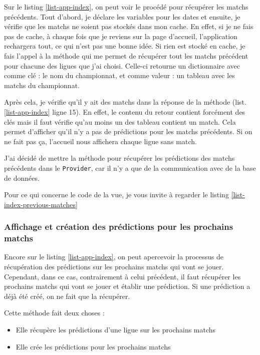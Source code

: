 \documentclass[a4paper,14pt]{extarticle}
\begin{document}
{Sur le listing \ref{list-app-index}, on peut voir le procédé pour récupérer les matchs précédents. Tout d'abord, je déclare les variables pour les dates et ensuite, je vérifie que les matchs ne soient pas stockés dans mon cache. En effet, si je ne fais pas de cache, à chaque fois que je reviens sur la page d'accueil, l'application rechargera tout, ce qui n'est pas une bonne idée. Si rien est stocké en cache, je fais l'appel à la méthode qui me permet de récupérer tout les matchs précédent pour chacune des ligues que j'ai choisi. Celle-ci retourne un dictionnaire avec comme clé : le nom du championnat, et comme valeur : un tableau avec les matchs du championnat. 

Après cela, je vérifie qu'il y ait des matchs dans la réponse de la méthode (list. \ref{list-app-index} ligne 15). En effet, le contenu du retour contient forcément des clés mais il faut vérifie qu'au moins un des tableau contient un match. Cela permet d'afficher qu'il n'y a pas de prédictions pour les matchs précédents. Si on ne fait pas ça, l'accueil nous affichera chaque ligue sans match.


J'ai décidé de mettre la méthode pour récupérer les prédictions des matchs précédents dans le \texttt{Provider}, car il n'y a que de la communication avec de la base de données.

Pour ce qui concerne le code de la vue, je vous invite à regarder le listing \ref{list-index-previous-matches}


\subsubsection{Affichage et création des prédictions pour les prochains matchs}

Encore sur le listing \ref{list-app-index}, on peut apercevoir la processus de récupération des prédictions sur les prochains matchs qui vont se jouer. Cependant, dans ce cas, contrairement à celui précédent, il faut récupérer les prochains matchs qui vont se jouer et établir une prédiction. Si une prédiction a déjà été créé, on ne fait que la récupérer.


Cette méthode fait deux choses :
\begin{itemize}
    \item Elle récupère les prédictions d'une ligue sur les prochains matchs
    \item Elle crée les prédictions pour les prochains matchs
\end{itemize}

}
\end{document}
